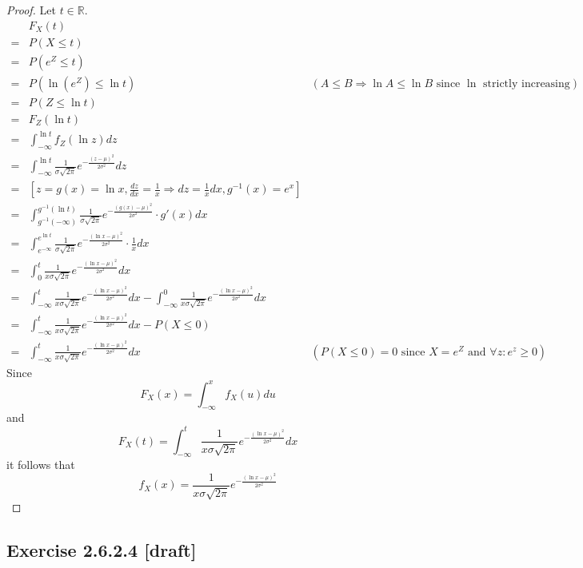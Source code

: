 \documentclass{article}
\begin{document}
\begin{proof}
Let \(t \in \mathbb{R}\).
\begin{align*}
     & F_X(t) \\
    =& P(X\leq t) \\
    =& P(e^Z\leq t) \\
    =& P(\ln(e^Z)\leq \ln{t}) & (A\leq B \Rightarrow \ln{A}\leq \ln{B}\text{ since }\ln\text{ strictly increasing}) \\
    =& P(Z\leq \ln{t}) \\
    =& F_Z(\ln{t}) \\
    =& \int_{-\infty}^{\ln{t}}f_Z(\ln{z})dz \\
    =& \int_{-\infty}^{\ln{t}} \frac{1}{\sigma\sqrt{2\pi}} e^{-\frac{(z-\mu)^2}{2\sigma^2}} dz \\
    =& \left[z=g(x)=\ln{x}, \frac{dz}{dx}=\frac{1}{x}\Rightarrow dz=\frac{1}{x}dx, g^{-1}(x) = e^x\right] \\
    =& \int_{g^{-1}(-\infty)}^{g^{-1}(\ln{t})} \frac{1}{\sigma\sqrt{2\pi}} e^{-\frac{(g(x)-\mu)^2}{2\sigma^2}} \cdot g'(x)dx \\
    =& \int_{e^{-\infty}}^{e^{\ln{t}}} \frac{1}{\sigma\sqrt{2\pi}} e^{-\frac{(\ln{x}-\mu)^2}{2\sigma^2}} \cdot \frac{1}{x}dx \\
    =& \int_0^t \frac{1}{x\sigma\sqrt{2\pi}} e^{-\frac{(\ln{x}-\mu)^2}{2\sigma^2}}dx \\
    =& \int_{-\infty}^t \frac{1}{x\sigma\sqrt{2\pi}} e^{-\frac{(\ln{x}-\mu)^2}{2\sigma^2}}dx - \int_{-\infty}^0 \frac{1}{x\sigma\sqrt{2\pi}} e^{-\frac{(\ln{x}-\mu)^2}{2\sigma^2}}dx \\
    =& \int_{-\infty}^t \frac{1}{x\sigma\sqrt{2\pi}} e^{-\frac{(\ln{x}-\mu)^2}{2\sigma^2}}dx - P(X\leq 0) \\
    =& \int_{-\infty}^t \frac{1}{x\sigma\sqrt{2\pi}} e^{-\frac{(\ln{x}-\mu)^2}{2\sigma^2}}dx & (P(X\leq 0)=0\text{ since }X=e^Z\text{ and }\forall z: e^z\geq 0)
\end{align*}
Since
\[F_X(x)=\int_{-\infty}^x f_X(u)du\]
and
\[F_X(t)=\int_{-\infty}^t \frac{1}{x\sigma\sqrt{2\pi}} e^{-\frac{(\ln{x}-\mu)^2}{2\sigma^2}}dx\]
it follows that
\[f_X(x) = \frac{1}{x\sigma\sqrt{2\pi}} e^{-\frac{(\ln{x}-\mu)^2}{2\sigma^2}}\]
\end{proof}

\subsection{Exercise 2.6.2.4 [draft]}
\end{document}
